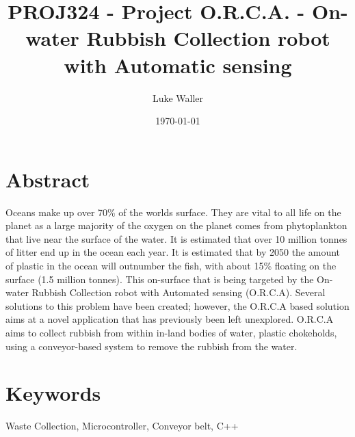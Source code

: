 \documentclass [11pt]{article}
\begin{document}

							
\title{\bf PROJ324 - Project O.R.C.A. - On-water Rubbish Collection robot with Automatic sensing} 	
\author{Luke Waller} 								
\date{\today} 										
\maketitle
\thispagestyle{empty}

\newpage 	

\section*{Abstract}

Oceans make up over 70\% of the worlds surface. They are vital to all life on the planet as a large majority of the oxygen on the planet comes from phytoplankton that live near the surface of the water. It is estimated that over 10 million tonnes of litter end up in the ocean each year. It is estimated that by 2050 the amount of plastic in the ocean will outnumber the fish, with about 15\% floating on the surface (1.5 million tonnes). This on-surface that is being targeted by the On-water Rubbish Collection robot with Automated sensing (O.R.C.A). 
Several solutions to this problem have been created; however, the O.R.C.A based solution aims at a novel application that has previously been left unexplored. O.R.C.A aims to collect rubbish from within in-land bodies of water, plastic chokeholds, using a conveyor-based system to remove the rubbish from the water. 

\section*{Keywords} 
Waste Collection, Microcontroller, Conveyor belt, C++
\end{document}
